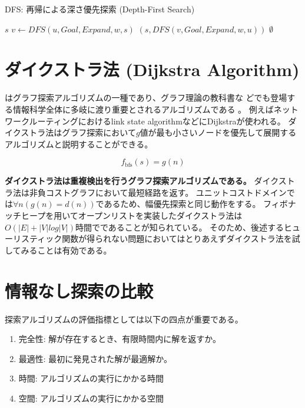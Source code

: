 \begin{algorithm}[tbh]
\caption{DFS: 再帰による深さ優先探索 (Depth-First Search)}
\label{alg:recursive-dfs}
	 {
		\Return $s$\;
	}
	 {
          $v \leftarrow DFS(u, Goal, Expand, w, s)$\;
	   {
	    \Return $(s, DFS(v, Goal, Expand, w, u))$
	  }
	}
	\Return $\emptyset$\;
\end{algorithm}


\section{ダイクストラ法 (Dijkstra Algorithm)}
\label{sec:dijkstra}

はグラフ探索アルゴリズムの一種であり、グラフ理論の教科書な
どでも登場する情報科学全体に多岐に渡り重要とされるアルゴリズムである \cite{dijkstra1959note}。
例えばネットワークルーティングにおけるlink state algorithmなどにDijkstraが使われる\cite{mcquillan1980new}。
ダイクストラ法はグラフ探索において$g$値が最も小さいノードを優先して展開するアルゴリズムと説明することができる。

\begin{equation}
  f_{\text{bfs}}(s) = g(n)
\end{equation}

{\bf ダイクストラ法は重複検出を行うグラフ探索アルゴリズムである。}
ダイクストラ法は非負コストグラフにおいて最短経路を返す。
ユニットコストドメインでは$\forall n (g(n) = d(n))$であるため、幅優先探索と同じ動作をする。
フィボナッチヒープを用いてオープンリストを実装したダイクストラ法は$O(|E| + |V|log|V|)$時間でであることが知られている\cite{fredman1987fibonacci}。
そのため、後述するヒューリスティック関数が得られない問題においてはとりあえずダイクストラ法を試してみることは有効である。


\section{情報なし探索の比較}
\label{sec:blind-comparison}

探索アルゴリズムの評価指標としては以下の四点が重要である。

\begin{enumerate}
\item 完全性: 解が存在するとき、有限時間内に解を返すか。
\item 最適性: 最初に発見された解が最適解か。
\item 時間: アルゴリズムの実行にかかる時間
\item 空間: アルゴリズムの実行にかかる空間
\end{enumerate}

